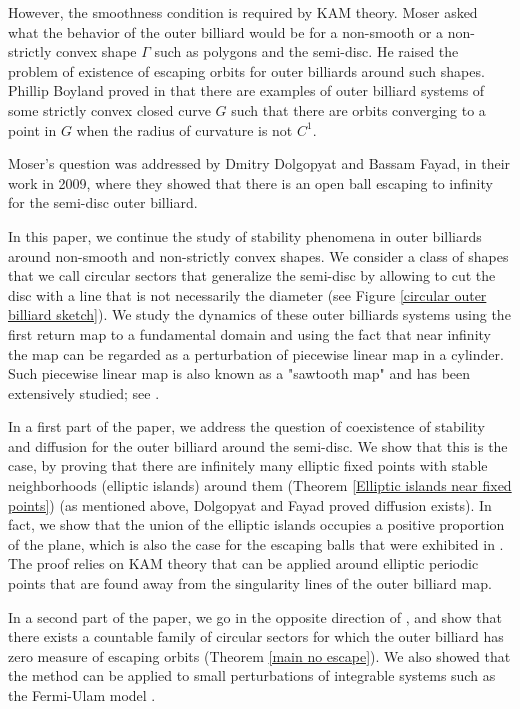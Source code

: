 \documentclass{article}
\numberwithin{figure}{section}
\numberwithin{equation}{section}
\theoremstyle{remark}
\theoremstyle{definition}
\begin{document}
However,  the smoothness condition is required by KAM theory. Moser asked what the behavior of the outer billiard would be for a non-smooth or a non-strictly convex shape $\Gamma$ such as polygons and the semi-disc. He raised the problem of existence of escaping orbits for outer billiards around such shapes. Phillip Boyland proved in \cite{boyland1994dualbilliardstwistmaps} that there are examples of outer billiard systems of some strictly convex closed curve $G$ such that there are orbits converging to a point in $G$ when the radius of curvature is not $C^1$.

Moser's question was addressed by Dmitry Dolgopyat and Bassam Fayad, in their work \cite{dolgopyat_unbounded_2009} in 2009, where they showed that there is an open ball escaping to infinity for the semi-disc outer billiard. 



In this paper, we continue the study of stability phenomena in outer billiards around non-smooth and non-strictly convex shapes. 
We consider a class of shapes that we call circular sectors that generalize the semi-disc by allowing to cut the disc with a line that is not necessarily the diameter (see Figure \ref{circular outer billiard sketch}). We study the dynamics of these outer billiards systems using the first return map to a fundamental domain and using the fact that near infinity the map can be regarded as a perturbation of piecewise linear map in a cylinder. Such piecewise linear map is also known as a "sawtooth map" and has been extensively studied; see \cite{de2012dynamics,CHEN1990217,BIRD1988164,bullett_invariant_1986,QChen_1989,PhysRevA.24.2664,PERCIVAL1987373,Wojtkowski_1982}.


In a first part of the paper, we address the question of coexistence of stability and diffusion for the outer billiard around the semi-disc. 
We show that this is the case, by proving that there are infinitely many elliptic fixed points with stable
neighborhoods (elliptic islands) around them (Theorem \ref{Elliptic islands near fixed points}) (as mentioned above, Dolgopyat and Fayad proved diffusion exists). In fact, we show that the union of the elliptic islands occupies a positive proportion of the plane, which is also the case for the escaping balls that were exhibited in \cite{dolgopyat_unbounded_2009}. The proof relies on KAM theory that can be applied around elliptic periodic points that are found away from the singularity lines of the outer billiard map. 

In a second part of the paper, we go in the opposite direction of \cite{dolgopyat_unbounded_2009}, and show that there exists a countable family of circular sectors for which the outer billiard has zero measure of escaping orbits (Theorem \ref{main no escape}). We also showed that the method can be applied to small perturbations of integrable systems such as the Fermi-Ulam model \cite{de2012dynamics}.
\end{document}
